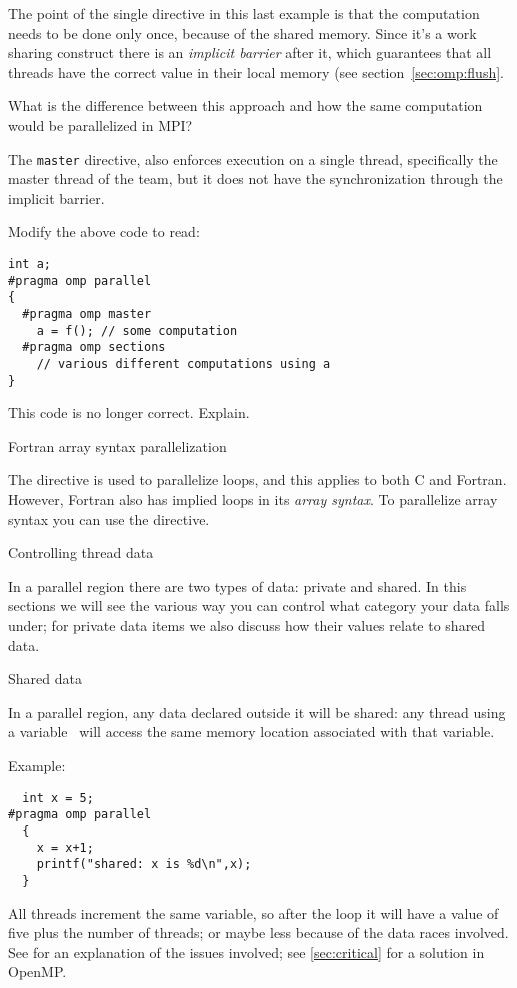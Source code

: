 The point of the single directive in this last example is that the
computation needs to be done only once, because of the shared memory.
Since it's a work sharing construct there is an \emph{implicit
  barrier} after it,
which guarantees that all threads have the correct value in their
local memory (see section~\ref{sec:omp:flush}.

\begin{exercise}
  What is the difference between this approach and how the same
  computation would be parallelized in MPI?
\end{exercise}

The \texttt{master} directive, also enforces execution
on a single thread, specifically the master thread of the team,
but it does not have the synchronization through the implicit barrier.

\begin{exercise}
  Modify the above code to read:
\begin{verbatim}
int a;
#pragma omp parallel
{
  #pragma omp master
    a = f(); // some computation
  #pragma omp sections
    // various different computations using a
}
\end{verbatim}
  This code is no longer correct. Explain.
\end{exercise}

 {Fortran array syntax parallelization}

The  directive is used to parallelize loops,
and this applies to both C and Fortran. However, Fortran also
has implied loops in its \emph{array syntax}.
To parallelize array syntax you can use the 
directive.

 {Controlling thread data}

In a parallel region there are two types of data: private and shared.
In this sections we will see the various way you can control what category
your data falls under; for private data items we also discuss how their values
relate to shared data.

 {Shared data}

In a parallel region, any data declared outside it will be shared:
any thread using a variable~ will access the same memory location
associated with that variable.

Example:
\begin{verbatim}
  int x = 5;
#pragma omp parallel
  {
    x = x+1;
    printf("shared: x is %d\n",x);
  }
\end{verbatim}
All threads increment the same variable, so after the loop it will
have a value of five plus the number of threads; or maybe less because of the data races
involved. See  for an explanation of the issues involved;
see \ref{sec:critical} for a solution in OpenMP.

